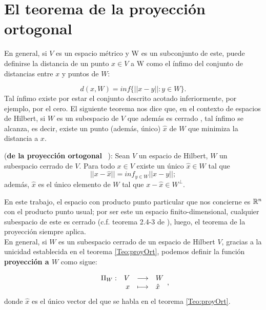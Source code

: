 \section{El teorema de la proyección ortogonal}

En general, si $V$ es un espacio métrico y W es un subconjunto
de este, puede definirse la distancia de un punto $x \in V$ a W como
el ínfimo del conjunto de distancias entre $x$ y puntos de $W$:

\[
d(x,W)=inf\{||x-y||: y \in W \}.
\]
\noindent 
Tal ínfimo existe por estar el conjunto descrito acotado inferiormente,
por ejemplo, por el cero. El siguiente teorema nos dice que,
en el contexto de espacios de Hilbert, si $W$ es un subespacio de $V$
que además es cerrado , 
tal ínfimo se alcanza, es decir, existe un punto
(además, único) $\hat{x}$ de $W$ que minimiza la distancia a $x$. \\

\begin{teo} 
\label{Teo:proyOrt}
(\textbf{de la proyección ortogonal}
~\cite{Nimark}):
Sean $V$ un espacio de Hilbert, $W$ un subespacio cerrado de $V$. 
Para todo $x \in V$ existe un único $\hat{x} \in W$ tal que
\[
||x- \hat{x}|| = inf_{y \in W}|| x-y ||;
\]
además, $\hat{x}$ es el único elemento de $W$
tal que $x-\hat{x} \in W^{\perp} $.
\end{teo}


En este trabajo, 
el espacio con producto punto
particular que nos concierne 
es $\mathbb{R}^{n}$ con el producto punto usual; por ser
este un espacio finito-dimensional, 
cualquier subespacio de este es cerrado
(c.f. teorema 2.4-3 de \cite{Kreyszig}),
luego, el teorema de la proyección siempre aplica. \\

En general, si $W$ es un subespacio cerrado de
un espacio de Hilbert $V$, gracias a la unicidad
establecida en el teorema \ref{Teo:proyOrt},
podemos definir la función \textbf{proyección a $W$}
como sigue:

\begin{equation}
\label{eq3: 1Dic}
\text{${\begin{array}{crcl} \Pi_{W}: & V & \longrightarrow & W \\ \, & x & \longmapsto & \hat{x} \end{array}}$},
\end{equation}
donde $\hat{x}$ es el único vector del que se habla
en el teorema \ref{Teo:proyOrt}.



